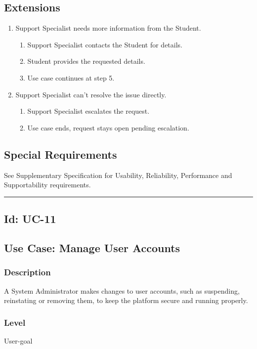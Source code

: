 \documentclass[10pt,letterpaper]{article}
\newcommand{\ucseparator}{\vspace{1em}\noindent\rule{\linewidth}{0.4pt}\vspace{1.5em}}
\begin{document}
\subsection*{Extensions}
\begin{enumerate}
    \item[5a.] Support Specialist needs more information from the Student.
    \begin{enumerate}
        \item[1.] Support Specialist contacts the Student for details.
        \item[2.] Student provides the requested details.
        \item[3.] Use case continues at step 5.
    \end{enumerate}
    \item[6a.] Support Specialist can't resolve the issue directly.
    \begin{enumerate}
        \item[1.] Support Specialist escalates the request.
        \item[2.] Use case ends, request stays open pending escalation.
    \end{enumerate}
\end{enumerate}

\subsection*{Special Requirements}
See Supplementary Specification for Usability, Reliability, Performance and Supportability requirements.

\ucseparator

\subsection*{Id: UC-11}

\subsection*{Use Case: Manage User Accounts}

\subsubsection*{Description}
A System Administrator makes changes to user accounts, such as suspending, reinstating or removing them, to keep the platform secure and running properly.

\subsubsection*{Level}
User-goal
\end{document}
